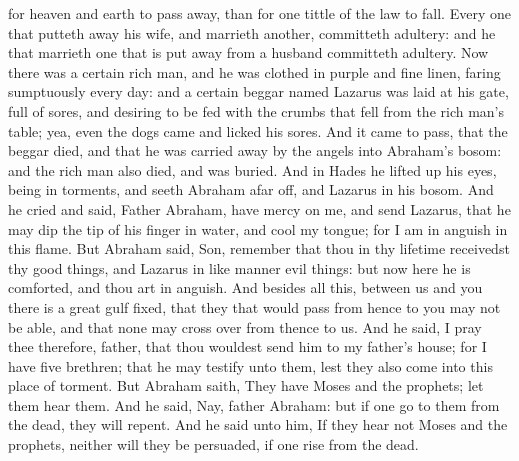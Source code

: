 for heaven and earth to pass away, than for one tittle of the law to fall.  Every one that putteth away his wife, and marrieth another, committeth adultery: and he that marrieth one that is put away from a husband committeth adultery.  Now there was a certain rich man, and he was clothed in purple and fine linen, faring sumptuously every day: and a certain beggar named Lazarus was laid at his gate, full of sores, and desiring to be fed with the crumbs that fell from the rich man’s table; yea, even the dogs came and licked his sores. And it came to pass, that the beggar died, and that he was carried away by the angels into Abraham’s bosom: and the rich man also died, and was buried. And in Hades he lifted up his eyes, being in torments, and seeth Abraham afar off, and Lazarus in his bosom. And he cried and said, Father Abraham, have mercy on me, and send Lazarus, that he may dip the tip of his finger in water, and cool my tongue; for I am in anguish in this flame. But Abraham said, Son, remember that thou in thy lifetime receivedst thy good things, and Lazarus in like manner evil things: but now here he is comforted, and thou art in anguish. And besides all this, between us and you there is a great gulf fixed, that they that would pass from hence to you may not be able, and that none may cross over from thence to us. And he said, I pray thee therefore, father, that thou wouldest send him to my father’s house; for I have five brethren; that he may testify unto them, lest they also come into this place of torment. But Abraham saith, They have Moses and the prophets; let them hear them. And he said, Nay, father Abraham: but if one go to them from the dead, they will repent. And he said unto him, If they hear not Moses and the prophets, neither will they be persuaded, if one rise from the dead. 

